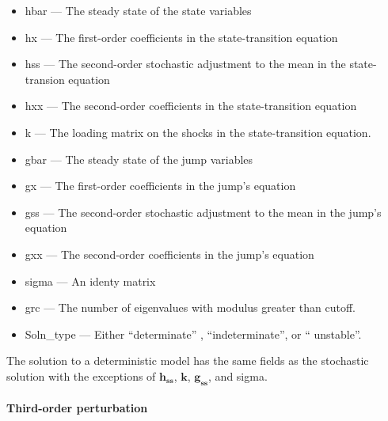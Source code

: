 \documentclass[notitlepage,11pt]{article}
\begin{document}
\begin{itemize}
\item hbar --- The steady state of the state variables

\item hx --- The first-order coefficients in the state-transition equation

\item hss --- The second-order stochastic adjustment to the mean in the
state-transion equation

\item hxx --- The second-order coefficients in the state-transition equation

\item k --- The loading matrix on the shocks in the state-transition
equation.

\item gbar --- The steady state of the jump variables

\item gx --- The first-order coefficients in the jump's equation

\item gss --- The second-order stochastic adjustment to the mean in the
jump's equation

\item gxx --- The second-order coefficients in the jump's equation

\item sigma --- An identy matrix

\item grc --- The number of eigenvalues with modulus greater than cutoff.

\item Soln\_type --- Either \textquotedblleft determinate\textquotedblright
, \textquotedblleft indeterminate\textquotedblright , or \textquotedblleft
unstable\textquotedblright .
\end{itemize}

The solution to a deterministic model has the same fields as the stochastic
solution with the exceptions of $\mathbf{h}_{\mathbf{ss}}$, $\mathbf{k}$, $%
\mathbf{g}_{\mathbf{ss}}$, and sigma.

\paragraph{Third-order perturbation}
\end{document}
